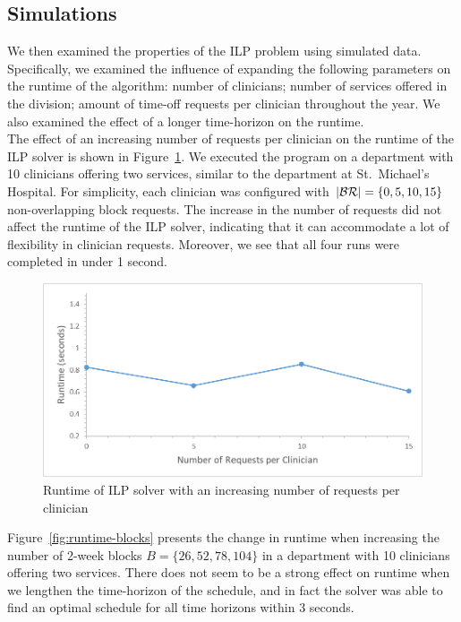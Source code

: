 

\subsection{Simulations}
We then examined the properties of the ILP problem using simulated data.
Specifically, we examined the influence of expanding the following parameters on
the runtime of the algorithm: number of clinicians; number of services offered
in the division; amount of time-off requests per clinician throughout the year.
We also examined the effect of a longer time-horizon on the runtime. \\

The effect of an increasing number of requests per clinician on the runtime of
the ILP solver is shown in Figure~\ref{fig:runtime-requests}. We executed the
program on a department with 10 clinicians offering two services, similar to the
department at St.\ Michael's Hospital. For simplicity, each clinician was
configured with $\abs{\mathcal{BR}} = \{0, 5, 10, 15\}$ non-overlapping block
requests. The increase in the number of requests did not affect the runtime of
the ILP solver, indicating that it can accommodate a lot of flexibility in
clinician requests. Moreover, we see that all four runs were completed in under
1 second. \\

\begin{figure}[h]
	\centering
	\includegraphics[scale=.5]{fig/runtime_requests}
	\caption{Runtime of ILP solver with an increasing number of requests per
		clinician}\label{fig:runtime-requests}
\end{figure}

Figure~\ref{fig:runtime-blocks} presents the change in runtime when increasing
the number of 2-week blocks $B = \{26, 52, 78, 104\}$ in a department with 10
clinicians offering two services. There does not seem to be a strong effect on
runtime when we lengthen the time-horizon of the schedule, and in fact the
solver was able to find an optimal schedule for all time horizons within 3
seconds. \\ %


